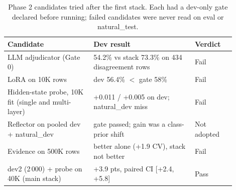 \begin{table}[htbp]
\centering
\caption{Phase 2 candidates tried after the first stack. Each had a dev-only gate declared before running; failed candidates were never read on eval or natural\_test.}
\label{tab:e23ledger}
\small
\begin{tabular}{p{0.34\linewidth}p{0.40\linewidth}p{0.16\linewidth}}
\toprule
\textbf{Candidate} & \textbf{Dev result} & \textbf{Verdict} \\
\midrule
LLM adjudicator (Gate 0) & 54.2\% vs stack 73.3\% on 434 disagreement rows & Fail \\
LoRA on 10K rows & dev 56.4\% $<$ gate 58\% & Fail \\
Hidden-state probe, 10K fit (single and multi-layer) & +0.011 / +0.005 on dev; natural\_dev miss & Fail \\
Reflector on pooled dev + natural\_dev & gate passed; gain was a class-prior shift & Not adopted \\
Evidence on 500K rows & better alone (+1.9 CV), stack not better & Fail \\
dev2 (2\,000) + probe on 40K (main stack) & +3.9 pts, paired CI [+2.4, +5.8] & Pass \\
\bottomrule
\end{tabular}
\end{table}

